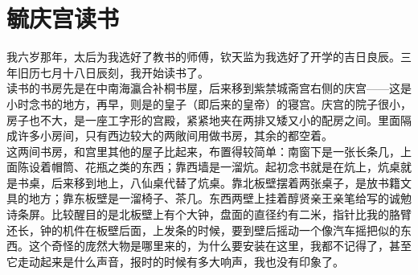 \fancyhead[RO]{} %
\fancyhead[LE]{} %
\chapter*{毓庆宫读书}
\thispagestyle{empty}
我六岁那年，太后为我选好了教书的师傅，钦天监为我选好了开学的吉日良辰。三年旧历七月十八日辰刻，我开始读书了。\\

读书的书房先是在中南海瀛合补桐书屋，后来移到紫禁城斋宫右侧的庆宫——这是小时念书的地方，再早，则是的皇子（即后来的皇帝）的寝宫。庆宫的院子很小，房子也不大，是一座工字形的宫殿，紧紧地夹在两排又矮又小的配房之间。里面隔成许多小房间，只有西边较大的两敞间用做书房，其余的都空着。\\

这两间书房，和宫里其他的屋子比起来，布置得较简单：南窗下是一张长条几，上面陈设着帽筒、花瓶之类的东西；靠西墙是一溜炕。起初念书就是在炕上，炕桌就是书桌，后来移到地上，八仙桌代替了炕桌。靠北板壁摆着两张桌子，是放书籍文具的地方；靠东板壁是一溜椅子、茶几。东西两壁上挂着醇贤亲王亲笔给写的诚勉诗条屏。比较醒目的是北板壁上有个大钟，盘面的直径约有二米，指针比我的胳臂还长，钟的机件在板壁后面，上发条的时候，要到壁后摇动一个像汽车摇把似的东西。这个奇怪的庞然大物是哪里来的，为什么要安装在这里，我都不记得了，甚至它走动起来是什么声音，报时的时候有多大响声，我也没有印象了。\\


